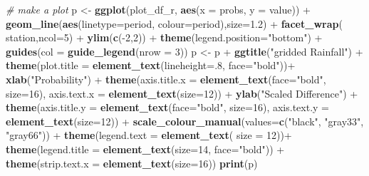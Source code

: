 \documentclass[]{article}
\newenvironment{Shaded}{\begin{snugshade}}{\end{snugshade}}
\newcommand{\KeywordTok}[1]{\textcolor[rgb]{0.13,0.29,0.53}{\textbf{{#1}}}}
\newcommand{\DataTypeTok}[1]{\textcolor[rgb]{0.13,0.29,0.53}{{#1}}}
\newcommand{\DecValTok}[1]{\textcolor[rgb]{0.00,0.00,0.81}{{#1}}}
\newcommand{\FloatTok}[1]{\textcolor[rgb]{0.00,0.00,0.81}{{#1}}}
\newcommand{\StringTok}[1]{\textcolor[rgb]{0.31,0.60,0.02}{{#1}}}
\newcommand{\CommentTok}[1]{\textcolor[rgb]{0.56,0.35,0.01}{\textit{{#1}}}}
\newcommand{\NormalTok}[1]{{#1}}
\begin{document}
\begin{Shaded}
\begin{Highlighting}[]
\CommentTok{# make a plot}
\NormalTok{p <-}\StringTok{ }\KeywordTok{ggplot}\NormalTok{(plot_df_r, }\KeywordTok{aes}\NormalTok{(}\DataTypeTok{x =} \NormalTok{probs, }\DataTypeTok{y =} \NormalTok{value)) +}
\StringTok{  }\KeywordTok{geom_line}\NormalTok{(}\KeywordTok{aes}\NormalTok{(}\DataTypeTok{linetype=}\NormalTok{period, }\DataTypeTok{colour=}\NormalTok{period),}\DataTypeTok{size=}\FloatTok{1.2}\NormalTok{) +}\StringTok{ }
\StringTok{  }\KeywordTok{facet_wrap}\NormalTok{(~}\StringTok{ }\NormalTok{station,}\DataTypeTok{ncol=}\DecValTok{5}\NormalTok{) +}\StringTok{ }\KeywordTok{ylim}\NormalTok{(}\KeywordTok{c}\NormalTok{(-}\DecValTok{2}\NormalTok{,}\DecValTok{2}\NormalTok{)) +}
\StringTok{  }\KeywordTok{theme}\NormalTok{(}\DataTypeTok{legend.position=}\StringTok{"bottom"}\NormalTok{) +}
\StringTok{  }\KeywordTok{guides}\NormalTok{(}\DataTypeTok{col =} \KeywordTok{guide_legend}\NormalTok{(}\DataTypeTok{nrow =} \DecValTok{3}\NormalTok{))}
\NormalTok{p <-}\StringTok{ }\NormalTok{p +}\StringTok{ }\KeywordTok{ggtitle}\NormalTok{(}\StringTok{"gridded Rainfall"}\NormalTok{) +}
\StringTok{  }\KeywordTok{theme}\NormalTok{(}\DataTypeTok{plot.title =} \KeywordTok{element_text}\NormalTok{(}\DataTypeTok{lineheight=}\NormalTok{.}\DecValTok{8}\NormalTok{, }\DataTypeTok{face=}\StringTok{"bold"}\NormalTok{))+}
\StringTok{  }\KeywordTok{xlab}\NormalTok{(}\StringTok{"Probability"}\NormalTok{) +}
\StringTok{  }\KeywordTok{theme}\NormalTok{(}\DataTypeTok{axis.title.x =} \KeywordTok{element_text}\NormalTok{(}\DataTypeTok{face=}\StringTok{"bold"}\NormalTok{,  }\DataTypeTok{size=}\DecValTok{16}\NormalTok{),}
        \DataTypeTok{axis.text.x  =} \KeywordTok{element_text}\NormalTok{(}\DataTypeTok{size=}\DecValTok{12}\NormalTok{)) +}
\StringTok{  }\KeywordTok{ylab}\NormalTok{(}\StringTok{"Scaled Difference"}\NormalTok{) +}
\StringTok{  }\KeywordTok{theme}\NormalTok{(}\DataTypeTok{axis.title.y =} \KeywordTok{element_text}\NormalTok{(}\DataTypeTok{face=}\StringTok{"bold"}\NormalTok{,  }\DataTypeTok{size=}\DecValTok{16}\NormalTok{),}
        \DataTypeTok{axis.text.y  =} \KeywordTok{element_text}\NormalTok{(}\DataTypeTok{size=}\DecValTok{12}\NormalTok{)) +}
\StringTok{ }\KeywordTok{scale_colour_manual}\NormalTok{(}\DataTypeTok{values=}\KeywordTok{c}\NormalTok{(}\StringTok{"black"}\NormalTok{, }\StringTok{"gray33"}\NormalTok{, }\StringTok{"gray66"}\NormalTok{)) +}
\StringTok{  }\KeywordTok{theme}\NormalTok{(}\DataTypeTok{legend.text =} \KeywordTok{element_text}\NormalTok{( }\DataTypeTok{size =} \DecValTok{12}\NormalTok{))+}
\StringTok{  }\KeywordTok{theme}\NormalTok{(}\DataTypeTok{legend.title =} \KeywordTok{element_text}\NormalTok{(}\DataTypeTok{size=}\DecValTok{14}\NormalTok{, }\DataTypeTok{face=}\StringTok{"bold"}\NormalTok{)) +}
\StringTok{  }\KeywordTok{theme}\NormalTok{(}\DataTypeTok{strip.text.x =} \KeywordTok{element_text}\NormalTok{(}\DataTypeTok{size=}\DecValTok{16}\NormalTok{))}
\KeywordTok{print}\NormalTok{(p)}
\end{Highlighting}
\end{Shaded}
\end{document}
